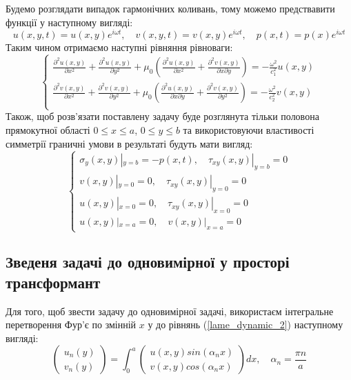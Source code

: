 Будемо розглядати випадок гармонічних коливань, тому можемо предствавити функції у наступному вигляді:
\begin{equation}
    u(x,y,t) = u(x,y) e^{i \omega t}, \quad v(x,y,t) = v(x,y) e^{i \omega t}, \quad p(x,t) = p(x) e^{i \omega t}
\end{equation}
Таким чином отримаємо наступні рівняння рівноваги:
\begin{equation}\label{lame_dynamic_2}
    \begin{cases}
        \frac{\partial^2 u(x,y)}{\partial x^2} + \frac{\partial^2 u(x,y)}{\partial y^2} + \mu_0 (\frac{\partial^2 u(x,y)}{\partial x^2} + \frac{\partial^2 v(x,y)}{\partial x\partial y}) = -\frac{\omega^2}{c_1^2}  u(x,y) \\
        \frac{\partial^2 v(x,y)}{\partial x^2} + \frac{\partial^2 v(x,y)}{\partial y^2} + \mu_0 (\frac{\partial^2 u(x,y)}{\partial x \partial y} + \frac{\partial^2 v(x,y)}{\partial y^2}) = -\frac{\omega^2}{c_2^2} v(x,y) \\
    \end{cases}
\end{equation}
Також, щоб розв'язати поставлену задачу буде розглянута тільки половона прямокутної області $0 \le x \le a$, $0 \le y \le b$
та використовуючи властивості симметрії граничні умови в результаті будуть мати вигляд:
\begin{equation}\label{bound_dynamic_2}
    \begin{cases}
        \sigma_y(x, y) |_{y=b} = -p(x, t), \quad  \tau_{xy}(x,y) |_{y=b} =0 \\
        v(x,y) |_{y=0} = 0, \quad \tau_{xy}(x,y) |_{y=0} = 0 \\
        u(x,y) |_{x=0} = 0, \quad \tau_{xy}(x,y) |_{x=0} = 0 \\
        u(x,y) |_{x=a} = 0, \quad v(x,y) |_{x=a} = 0
    \end{cases}
\end{equation}

\subsection{Зведеня задачі до одновимірної у просторі трансформант}
Для того, щоб звести задачу до одновимірної задачі, використаєм інтегральне перетворення Фур'є по змінній $x$ у до рівнянь (\ref{lame_dynamic_2}) наступному вигляді:
\begin{equation}
    \begin{pmatrix}
        u_n(y) \\
        v_n(y)
    \end{pmatrix} = \int_{0}^{a} 
    \begin{pmatrix}
        u(x,y) sin(\alpha_n x) \\
        v(x,y) cos(\alpha_n x)
    \end{pmatrix} dx, \quad \alpha_n = \frac{\pi n}{a}
\end{equation}

